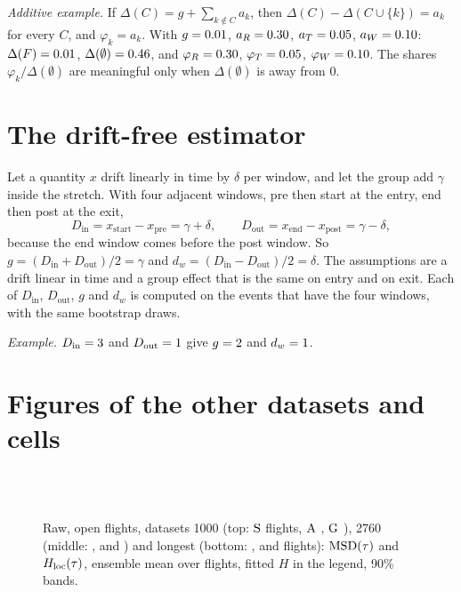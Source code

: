 \emph{Additive example.} If $\Delta(C)=g+\sum_{k\notin C}a_k$, then $\Delta(C)-\Delta(C\cup\{k\})=a_k$ for every $C$, and $\varphi_k=a_k$. With $g=0.01$, $a_R=0.30$, $a_T=0.05$, $a_W=0.10$:
$\Delta(F)=0.01$, $\Delta(\emptyset)=0.46$, and $\varphi_R=0.30$, $\varphi_T=0.05$, $\varphi_W=0.10$. The shares $\varphi_k/\Delta(\emptyset)$ are meaningful only when $\Delta(\emptyset)$ is away from 0.

\section{The drift-free estimator}\label{app:drift}

Let a quantity $x$ drift linearly in time by $\delta$ per window, and let the group add $\gamma$ inside the stretch. With four adjacent windows, pre then start at the entry, end then post at the exit,
\[
  D_\text{in}=x_\text{start}-x_\text{pre}=\gamma+\delta,\qquad D_\text{out}=x_\text{end}-x_\text{post}=\gamma-\delta,
\]
because the end window comes before the post window. So $g=(D_\text{in}+D_\text{out})/2=\gamma$ and $d_w=(D_\text{in}-D_\text{out})/2=\delta$. The assumptions are a drift linear in time and a group effect that is the same on entry and on exit.
Each of $D_\text{in}$, $D_\text{out}$, $g$ and $d_w$ is computed on the events that have the four windows, with the same bootstrap draws.

\emph{Example.} $D_\text{in}=3$ and $D_\text{out}=1$ give $g=2$ and $d_w=1$.

\section{Figures of the other datasets and cells}\label{app:figures}

\begin{figure}[h]
\centering
{}\\[4pt]
\\[4pt]
\caption{Raw, open flights, datasets 1000 (top: $\mathrm{S}$ \RawFlightsOneS{} flights, $\mathrm{A}$ \RawFlightsOneA, $\mathrm{G}$ \RawFlightsOneG), 2760 (middle: \RawFlightsTwoS, \RawFlightsTwoA{} and \RawFlightsTwoG) and longest (bottom: \RawFlightsLongS, \RawFlightsLongA{} and \RawFlightsLongG{} flights): $\mathrm{MSD}(\tau)$ and $H_\mathrm{loc}(\tau)$, ensemble mean over flights, fitted $H$ in the legend, 90\% bands.}
\label{fig:raw-more}
\end{figure}

